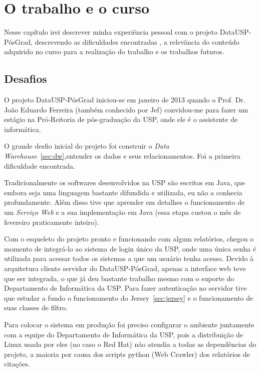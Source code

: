 \chapter{O trabalho e o curso}
\label{app:a}

Nesse capítulo irei descrever minha experiência pessoal com o projeto DataUSP-PósGrad, descrevendo as dificuldades encontradas
, a relevância do conteúdo adquirido no curso para a realização do trabalho e os trabalhos futuros.

\section{Desafios}

O projeto DataUSP-PósGrad iniciou-se em janeiro de 2013 quando o Prof. Dr. João Eduardo Ferreira (também conhecido por Jef) convidou-me para fazer um estágio na Pró-Reitoria de pós-graduação da USP, onde ele é o assistente de informática.

\par O grande desfio inicial do projeto foi construir o \emph{Data Warehouse}~\ref{sec:dw},entender os dados e seus relacionamentos. Foi a primeira dificuldade encontrada.

\par Tradicionalmente os softwares desenvolvidos na USP são escritos em Java, que embora seja uma linguagem bastante
difundida e utilizada, eu não a conhecia profundamente. Além disso tive que aprender em detalhes o funcionamento de um \emph{Serviço Web} e a sua implementação em Java (essa etapa custou o mês de fevereiro praticamente inteiro).

\par Com o esqueleto do projeto pronto e funcionando com algum relatórios, chegou o momento de integrá-lo ao sistema
de login único da USP, onde uma única senha é utilizada para acessar todos os sistemas a que um usuário tenha acesso. Devido à arquitetura cliente servidor do DataUSP-PósGrad, apenas a interface web teve que ser integrada, o que já deu bastante trabalho mesmo com o suporte do Departamento de Informática da USP. Para fazer autenticação no servidor tive que estudar a fundo o funcionamento do Jersey~\ref{sec:jersey} e o funcionamento de suas classes de filtro.

\par Para colocar o sistema em produção foi preciso configurar o ambiente juntamente com a equipe do Departamento de Informática da USP, pois a distribuição de Linux usada por eles (no caso o Red Hat) não atendia a todas as dependências do projeto, a maioria por causa dos scripts python (Web Crawler) dos relatórios de citações.

